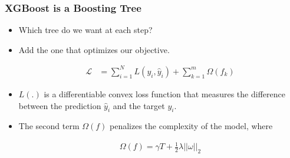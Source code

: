 \documentclass[
  shownotes,
  xcolor={svgnames},
  hyperref={colorlinks,citecolor=DarkBlue,linkcolor=DarkRed,urlcolor=DarkBlue}
  , aspectratio=169]{beamer}
\begin{document}
\begin{frame}[fragile]
\frametitle{XGBoost is a Boosting Tree }

\begin{itemize}


\item Which tree do we want at each step? 
\item Add the one that optimizes our objective.

\begin{align}
\mathcal{L} &= \sum_{i=1}^N L(y_i,\hat{y}_i) + \sum_{k=1}^m \Omega(f_k)
\end{align}

\item  $L(.)$ is a differentiable convex loss function that measures the difference between the prediction $\hat{y}_i$ and the target $y_i$. 
\item  The second term $\Omega(f)$ penalizes the complexity of the model, where


\begin{align}
\Omega(f)=\gamma T + \frac{1}{2}\lambda ||\omega||_2
\end{align}

\end{itemize}
\end{frame}

\end{document}
